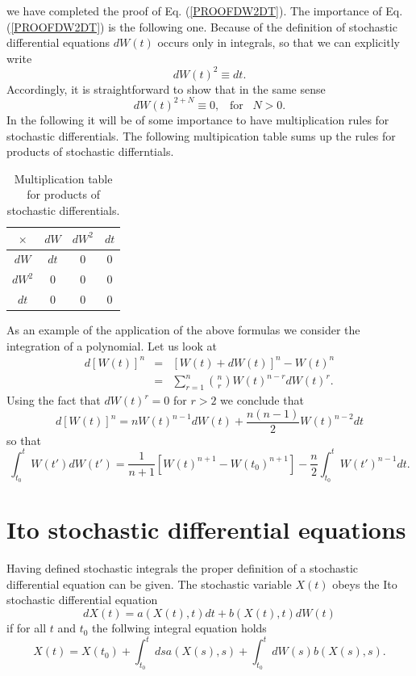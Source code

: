 we have completed the proof of Eq. (\ref{PROOFDW2DT}).
The importance of Eq. (\ref{PROOFDW2DT}) is the following one. Because
of the definition of stochastic differential equations $dW(t)$
occurs only in integrals, so that we can explicitly write
\begin{equation*}
dW(t)^2 \equiv dt.
\end{equation*}
Accordingly, it is straightforward to show that in the same sense
\begin{equation*}
dW(t)^{2+N} \equiv 0, \;\;\; \text{for} \;\;\; N>0.
\end{equation*}
In the following it will be of some importance to have 
multiplication rules for stochastic differentials. The following
multipication table sums up the rules for products of stochastic 
differntials.
\begin{table}
\caption{Multiplication table for products of stochastic differentials.}
\begin{center}
\begin{tabular}{|c||c|c|c|}\hline 
$\times$ & $dW$ & $dW^2$ & $dt$ \\ \hline \hline
$dW$     & $dt$ & $0$    & $0$   \\ \hline
$dW^2$   &  $0$ & $0$    &  $0$  \\ \hline
$dt$     &  $0$ & $0$    & $0$  \\ \hline
\end{tabular}
\end{center}
\end{table}
As an example of the application of the above formulas we consider the
integration of a polynomial. Let us look at
\begin{eqnarray*}
d[W(t)]^n & = & [W(t) + dW(t)]^n - W(t)^n \\
          & = & \sum_{r=1}^n {n \choose r} W(t)^{n-r} dW(t)^r .
\end{eqnarray*}
Using the fact that $dW(t)^r = 0$ for $r>2$ we conclude that
\begin{equation*}
d[W(t)]^n = n W(t)^{n-1}dW(t) +
\frac{n(n-1)}{2} W(t)^{n-2} dt
\end{equation*}
so that
\begin{equation*}
\int_{t_0}^t W(t')dW(t') = \frac{1}{n+1}  [W(t)^{n+1} - W(t_0)^{n+1}]
   -\frac{n}{2} \int_{t_0}^t W(t')^{n-1} dt.
\end{equation*}



\section{Ito stochastic differential equations}
Having defined stochastic integrals the proper definition of a
stochastic differential equation can be given. The stochastic variable
$X(t)$ obeys the Ito stochastic differential equation
\begin{equation}
\label{ITOSDE}
dX(t) = a(X(t),t) dt + b(X(t),t) dW(t)
\end{equation}
if for all $t$ and $t_0$ the follwing integral equation holds
\begin{equation}
X(t) = X(t_0) + \int_{t_0}^t ds a(X(s),s) 
     + \int_{t_0}^t dW(s) b(X(s),s).
\end{equation}

